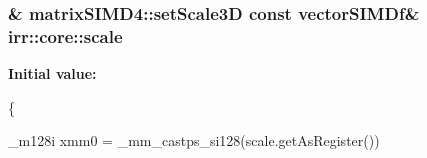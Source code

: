 \subsubsection[{\texorpdfstring{scale}{scale}}]{\& matrix\+S\+I\+M\+D4\+::set\+Scale3D const {\bf vector\+S\+I\+M\+Df}\& irr\+::core\+::scale\hspace{0.3cm}{\ttfamily [inline]}}\hypertarget{namespaceirr_1_1core_a621d6b469f69a73f208e70035d8ad151}{}\label{namespaceirr_1_1core_a621d6b469f69a73f208e70035d8ad151}
{\bfseries Initial value\+:}
\begin{DoxyCode}
\{
        
        \_m128i xmm0 = \_mm\_castps\_si128(scale.getAsRegister())
\end{DoxyCode}
